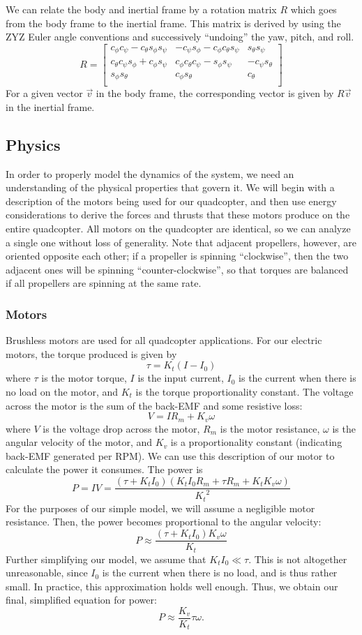 \documentclass{article}
\newcommand\bmatr[1]{\begin{bmatrix} #1\end{bmatrix}}
\begin{document}
We can relate the body and inertial frame by a rotation matrix $R$ which goes from the body frame to
the inertial frame. This matrix is derived by using the ZYZ Euler angle conventions and successively
``undoing'' the yaw, pitch, and roll.
\[R = \bmatr{
    c_\phi  c_\psi - c_\theta  s_\phi  s_\psi &  -c_\psi  s_\phi -  c_\phi  c_\theta  s_\psi &  s_\theta  s_\psi\\
    c_\theta  c_\psi  s_\phi + c_\phi  s_\psi &  c_\phi  c_\theta  c_\psi - s_\phi  s_\psi &  -c_\psi  s_\theta\\
    s_\phi  s_\theta &  c_\phi  s_\theta &  c_\theta\\
}\]
For a given vector $\vec v$ in the body frame, the corresponding vector is given by $R\vec v$ in the
inertial frame.

\subsection*{Physics}
In order to properly model the dynamics of the system, we need an understanding of the physical
properties that govern it. We will begin with a description of the motors being used for our
quadcopter, and then use energy considerations to derive the forces and thrusts that these motors
produce on the entire quadcopter. All motors on the quadcopter are identical, so we can analyze a
single one without loss of generality. Note that adjacent propellers, however, are oriented opposite
each other; if a propeller is spinning ``clockwise'', then the two adjacent ones will be spinning
``counter-clockwise'', so that torques are balanced if all propellers are spinning at the same rate.
\subsubsection*{Motors}
Brushless motors are used for all quadcopter applications. For our electric motors, the torque
produced is given by
\[\tau = K_t (I - I_0)\]
where $\tau$ is the motor torque, $I$ is the input current, $I_0$ is the current when there is no
load on the motor, and $K_t$ is the torque proportionality constant. The voltage across the motor is
the sum of the back-EMF and some resistive loss:
\[V = I R_m  + K_v \omega\]
where $V$ is the voltage drop across the motor, $R_m$ is the motor resistance, $\omega$ is the
angular velocity of the motor, and $K_v$ is a proportionality constant (indicating back-EMF
generated per RPM).
We can use this description of our motor to calculate the power it consumes. The power is
\[P = IV = \frac{(\tau + K_t I_0) (K_t I_0 R_m + \tau R_m + K_t K_v \omega)}{ {K_t}^2}\]
For the purposes of our simple model, we will assume a negligible motor resistance. Then, the power
becomes proportional to the angular velocity:
\[P \approx \frac{(\tau + K_t I_0)  K_v \omega}{ {K_t}}\]
Further simplifying our model, we assume that $K_t I_0 \ll \tau$. This is not altogether unreasonable,
since $I_0$ is the current when there is no load, and is thus rather small. In practice, this
approximation holds well enough. Thus, we obtain our final, simplified equation for power:
\[P \approx \frac{K_v}{K_t} \tau \omega.\]
\end{document}
